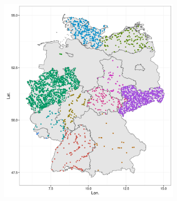 \documentclass[12pt, t]{beamer}
\begin{document}
\begin{frame}
\begin{figure}
\begin{subfigure}{.5\textwidth}
  \includegraphics[width=\linewidth]{fig/phch_map.png}
\end{subfigure}
\end{figure}
\end{frame}
\end{document}
